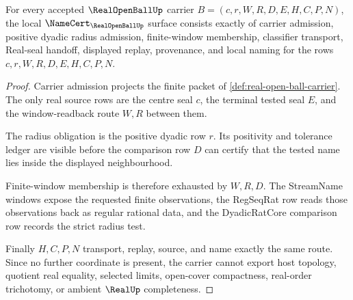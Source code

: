 \begin{theorem}
\label{thm:real-open-ball-namecert-obligations}
For every accepted $\RealOpenBallUp$ carrier $B=(c,r,W,R,D,E,H,C,P,N)$, the local $\NameCert_{\RealOpenBallUp}$ surface consists exactly of carrier admission, positive dyadic radius admission, finite-window membership, classifier transport, Real-seal handoff, displayed replay, provenance, and local naming for the rows $c,r,W,R,D,E,H,C,P,N$.
\end{theorem}
\begin{proof}
Carrier admission projects the finite packet of \autoref{def:real-open-ball-carrier}. The only real source rows are the centre seal $c$, the terminal tested seal $E$, and the window-readback route $W,R$ between them.

The radius obligation is the positive dyadic row $r$. Its positivity and tolerance ledger are visible before the comparison row $D$ can certify that the tested name lies inside the displayed neighbourhood.

Finite-window membership is therefore exhausted by $W,R,D$. The StreamName windows expose the requested finite observations, the RegSeqRat row reads those observations back as regular rational data, and the DyadicRatCore comparison row records the strict radius test.

Finally $H,C,P,N$ transport, replay, source, and name exactly the same route. Since no further coordinate is present, the carrier cannot export host topology, quotient real equality, selected limits, open-cover compactness, real-order trichotomy, or ambient $\RealUp$ completeness.
\end{proof}

